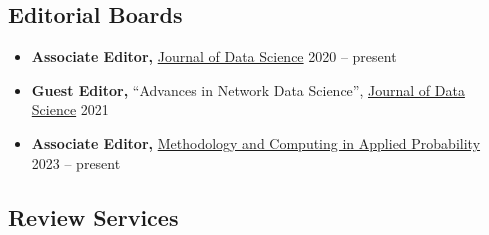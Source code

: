 \documentclass[12pt]{article}
\begin{document}
	\subsection*{Editorial Boards}
	\begin{itemize}
		\item \textbf{Associate Editor,} 
		\href{https://jds-online.org/journal/JDS}{Journal of Data Science} \hfill 2020 -- present
		\item \textbf{Guest Editor,} ``Advances in Network Data 
		Science'', \href{https://jds-online.org/journal/JDS}{Journal 
		of Data Science} \hfill 2021
		\item \textbf{Associate Editor,}
		\href{https://www.springer.com/journal/11009/}{Methodology 
		and Computing in Applied Probability} \hfill 2023 -- present
	\end{itemize}

	\subsection*{Review Services}
\end{document}
